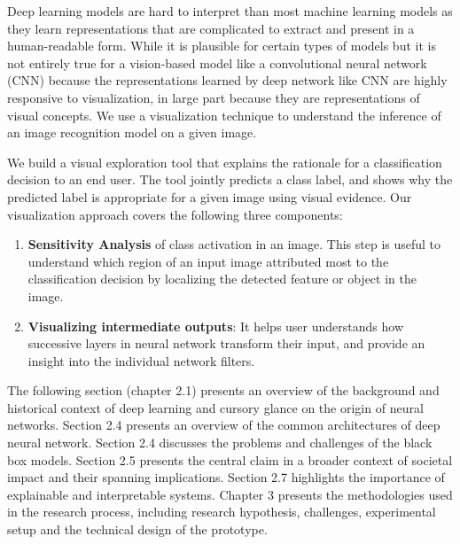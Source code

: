Deep learning models are hard to interpret than most machine learning models as they learn representations that are complicated to extract and present in a human-readable form.  While it is plausible for certain types of models but it is  not entirely true for a vision-based model like a convolutional neural network (CNN) because the representations learned by deep network like CNN are highly responsive to visualization, in large part because they are representations of visual concepts. We use a visualization technique to understand the inference of an image recognition model on a given image. 

We build a visual exploration tool that explains the rationale for a classification decision to an end user. The tool jointly predicts a class label,  and shows why the predicted label is appropriate for a given image using visual evidence. Our visualization approach covers the following three components:

\begin{enumerate}
\item \textbf{Sensitivity Analysis} of class activation in an image. This step is useful to understand which region of an input image attributed most to the classification decision by localizing the detected feature or object in the image.


\item  \textbf{Visualizing intermediate outputs}: It helps user understands how successive layers in neural network transform their input, and provide an insight into the individual network filters.

\end{enumerate}

The following section (chapter 2.1) presents an overview of the background and historical context of deep learning and cursory glance on the origin of neural networks.  Section 2.4 presents an overview of the common architectures of deep neural network.  Section 2.4 discusses the problems and challenges of the black box models. Section 2.5 presents the central claim in a broader context of societal impact and their spanning implications. Section 2.7 highlights the importance of explainable and interpretable systems.  Chapter 3 presents the methodologies used in the research process, including research hypothesis, challenges, experimental setup and the technical design of the prototype.

